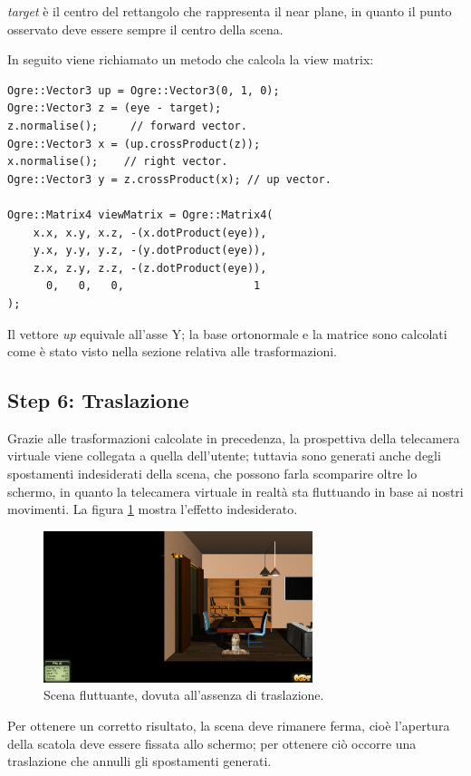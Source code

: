 \textit{target} è il centro del rettangolo che rappresenta il near plane, in quanto il punto osservato deve essere sempre il centro della scena.

In seguito viene richiamato un metodo che calcola la view matrix:

\begin{lstlisting}
Ogre::Vector3 up = Ogre::Vector3(0, 1, 0);
Ogre::Vector3 z = (eye - target); 
z.normalise();     // forward vector.
Ogre::Vector3 x = (up.crossProduct(z)); 
x.normalise();    // right vector.
Ogre::Vector3 y = z.crossProduct(x); // up vector.
 
Ogre::Matrix4 viewMatrix = Ogre::Matrix4(
    x.x, x.y, x.z, -(x.dotProduct(eye)),
    y.x, y.y, y.z, -(y.dotProduct(eye)),
    z.x, z.y, z.z, -(z.dotProduct(eye)),
      0,   0,   0,                    1
);
\end{lstlisting}
Il vettore \textit{up} equivale all'asse Y; la base ortonormale e la matrice sono calcolati come è stato visto nella sezione relativa alle trasformazioni.


\subsection*{Step 6: Traslazione} 
Grazie alle trasformazioni calcolate in precedenza, la prospettiva della telecamera virtuale viene collegata a quella dell'utente; tuttavia sono generati anche degli spostamenti indesiderati della scena, che possono farla scomparire oltre lo schermo, in quanto la telecamera virtuale in realtà sta fluttuando in base ai nostri movimenti. La figura \ref{no-transl} mostra l'effetto indesiderato.

\begin{figure}[htbp]
\centering
\includegraphics[width=0.7\textwidth]{images/progetto/ogre-transl.png}
\caption{Scena fluttuante, dovuta all'assenza di traslazione.\label{no-transl}}
\end{figure}
Per ottenere un corretto risultato, la scena deve rimanere ferma, cioè l'apertura della scatola deve essere fissata allo schermo; per ottenere ciò occorre una traslazione che annulli gli spostamenti generati.
\vspace{1.5cm}

